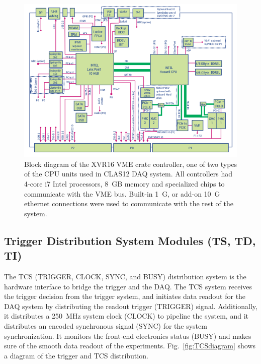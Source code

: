 \begin{figure}[hbt]
	\centering
	\includegraphics[width=1.0\columnwidth,keepaspectratio]{img/XVR16_diagram.png}
	\caption{Block diagram of the XVR16 VME crate controller, one of two types of the CPU units used in CLAS12 DAQ system. All controllers had 4-core i7 Intel processors, 8~GB memory and specialized chips to communicate with the VME bus. Built-in 1~G, or add-on 10~G ethernet connections were used to communicate with the rest of the system.}
	\label{fig:XVR16diagram}
\end{figure}



\subsection{Trigger Distribution System Modules (TS, TD, TI)}
	
The TCS (TRIGGER, CLOCK, SYNC, and BUSY) distribution system \cite{tcs-ref} is the hardware interface to bridge the trigger and the DAQ.  The TCS system receives the trigger decision from the trigger system, and initiates data readout for the DAQ system by distributing the readout trigger (TRIGGER) signal.  Additionally, it distributes a 250~MHz system clock (CLOCK) to pipeline the system, and it distributes an encoded synchronous signal (SYNC) for the system synchronization.  It monitors the front-end electronics status (BUSY) and makes sure of the smooth data readout of the experiments. Fig.~\ref{fig:TCSdiagram} shows a diagram of the trigger and TCS distribution.

